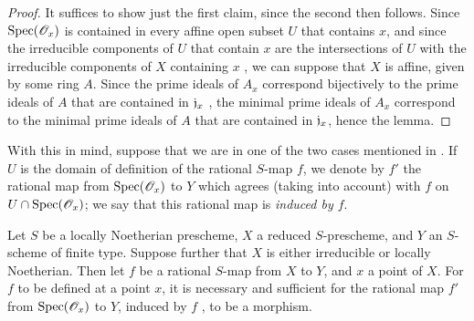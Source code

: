 \begin{proof}
\label{proof-1.7.2.8.1}
It suffices to show just the first claim, since the second then follows.
Since ${\mathop{\mathrm{Spec}}\nolimits}(\mathscr{O}_x)$ is contained in every affine open subset $U$ that contains $x$, and since the irreducible components of $U$ that contain $x$ are the intersections of $U$ with the irreducible components of $X$ containing $x$ , we can suppose that $X$ is affine, given by some ring $A$.
Since the prime ideals of $A_x$ correspond bijectively to the prime ideals of $A$ that are
contained in $\mathfrak{j}_x$ , the minimal prime ideals of $A_x$ correspond to the minimal prime ideals of $A$ that are contained in $\mathfrak{j}_x$, hence the lemma.
\end{proof}

With this in mind, suppose that we are in one of the two cases mentioned in .
If $U$ is the domain of definition of the rational $S$-map $f$, we denote by $f'$ the rational map from ${\mathop{\mathrm{Spec}}\nolimits}(\mathscr{O}_x)$ to $Y$ which agrees (taking  into account) with $f$ on $U\cap{\mathop{\mathrm{Spec}}\nolimits}(\mathscr{O}_x)$; we say that this rational map is \emph{induced by $f$}.

\begin{prop}[7.2.9]
\label{1.7.2.9}
Let $S$ be a locally Noetherian prescheme, $X$ a reduced $S$-prescheme, and $Y$ an $S$-scheme of finite type.
Suppose further that $X$ is either irreducible or locally Noetherian.
Then let $f$ be a rational $S$-map from $X$ to $Y$, and $x$ a point of $X$.
For $f$ to be defined at a point $x$, it is necessary and sufficient for the rational map $f'$ from ${\mathop{\mathrm{Spec}}\nolimits}(\mathscr{O}_x)$ to $Y$, induced by $f$ , to be a morphism.
\end{prop}

